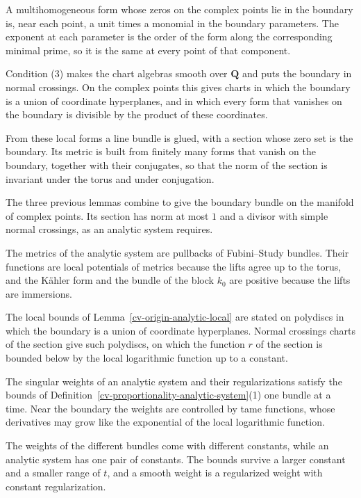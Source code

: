 A multihomogeneous form whose zeros on the complex points lie in the boundary is, near each point, a unit times a
monomial in the boundary parameters. The exponent at each parameter is the order of the form along the corresponding
minimal prime, so it is the same at every point of that component.

Condition (3) makes the chart algebras smooth over $\mathbf Q$ and puts the boundary in normal crossings. On the
complex points this gives charts in which the boundary is a union of coordinate hyperplanes, and in which every form
that vanishes on the boundary is divisible by the product of these coordinates.

From these local forms a line bundle is glued, with a section whose zero set is the boundary. Its metric is built
from finitely many forms that vanish on the boundary, together with their conjugates, so that the norm of the
section is invariant under the torus and under conjugation.

The three previous lemmas combine to give the boundary bundle on the manifold of complex points. Its section has
norm at most $1$ and a divisor with simple normal crossings, as an analytic system requires.

The metrics of the analytic system are pullbacks of Fubini--Study bundles. Their functions are local potentials of
metrics because the lifts agree up to the torus, and the K\"ahler form and the bundle of the block $k_0$ are positive
because the lifts are immersions.

The local bounds of Lemma~\ref{cv-origin-analytic-local} are stated on polydiscs in which the boundary is a union of
coordinate hyperplanes. Normal crossings charts of the section give such polydiscs, on which the function $r$ of the
section is bounded below by the local logarithmic function up to a constant.

The singular weights of an analytic system and their regularizations satisfy the bounds of
Definition~\ref{cv-proportionality-analytic-system}(1) one bundle at a time. Near the boundary the weights are
controlled by tame functions, whose derivatives may grow like the exponential of the local logarithmic function.

The weights of the different bundles come with different constants, while an analytic system has one pair of
constants. The bounds survive a larger constant and a smaller range of $t$, and a smooth weight is a regularized
weight with constant regularization.

